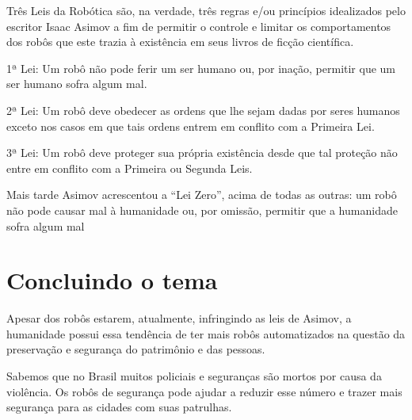 \documentclass[12pt,a4paper]{article}
\begin{document}
    Três Leis da Robótica são, na verdade, três regras e/ou princípios idealizados pelo escritor Isaac Asimov a fim de permitir o controle e limitar os comportamentos dos robôs que este trazia à existência em seus livros de ficção científica.

    1ª Lei: Um robô não pode ferir um ser humano ou, por inação, permitir que um ser humano sofra algum mal.

    2ª Lei: Um robô deve obedecer as ordens que lhe sejam dadas por seres humanos exceto nos casos em que tais ordens entrem em conflito com a Primeira Lei.

    3ª Lei: Um robô deve proteger sua própria existência desde que tal proteção não entre em conflito com a Primeira ou Segunda Leis.

    Mais tarde Asimov acrescentou a “Lei Zero”, acima de todas as outras: um robô não pode causar mal à humanidade ou, por omissão, permitir que a humanidade sofra algum mal

    \section{Concluindo o tema}
    Apesar dos robôs estarem, atualmente, infringindo as leis de Asimov, a humanidade possui essa tendência de ter mais robôs automatizados na questão da preservação e segurança do patrimônio e das pessoas.

    Sabemos que no Brasil muitos policiais e seguranças são mortos por causa da violência. Os robôs de segurança pode ajudar a reduzir esse número e trazer mais segurança para as cidades com suas patrulhas.  
\end{document}
